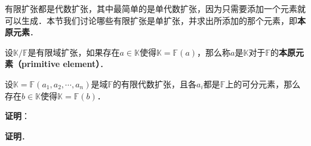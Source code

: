 


有限扩张都是代数扩张，其中最简单的是单代数扩张，因为只需要添加一个元素就可以生成．本节我们讨论哪些有限扩张是单扩张，并求出所添加的那个元素，即\textbf{本原元素}．

\begin{definition}{}\label{PrmtEl_def1}

设$\mathbb{K}/\mathbb{F}$是有限域扩张，如果存在$a\in\mathbb{K}$使得$\mathbb{K}=\mathbb{F}(a)$，那么称$a$是$\mathbb{K}$对于$\mathbb{F}$的\textbf{本原元素（primitive element）}．

\end{definition}



\begin{theorem}{}
设$\mathbb{K}=\mathbb{F}(a_1, a_2, \cdots, a_n)$是域$\mathbb{F}$的有限代数扩张，且各$a_i$都是$\mathbb{F}$上的可分元素，那么存在$b\in\mathbb{K}$使得$\mathbb{K}=\mathbb{F}(b)$．
\end{theorem}

\textbf{证明}：



\textbf{证明}．




























